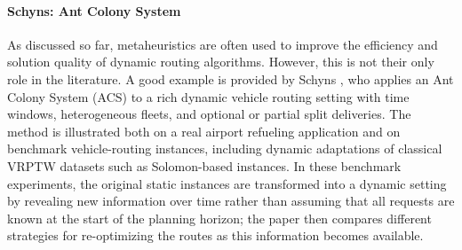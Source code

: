 \paragraph{Schyns: Ant Colony System}



As discussed so far, metaheuristics are often used to improve the efficiency and solution quality of dynamic routing algorithms.
However, this is not their only role in the literature. A good example is provided by Schyns \cite{AntColonySchyns2015}, 
who applies an Ant Colony System (ACS) to a rich dynamic vehicle routing setting with time windows, heterogeneous fleets, 
and optional or partial split deliveries. The method is illustrated both on a real airport refueling application and on 
benchmark vehicle-routing instances, including dynamic adaptations of classical VRPTW datasets such as Solomon-based instances.
In these benchmark experiments, the original static instances are transformed into a dynamic setting by revealing new information 
over time rather than assuming that all requests are known at the start of the planning horizon; the paper then compares 
different strategies for re-optimizing the routes as this information becomes available.


